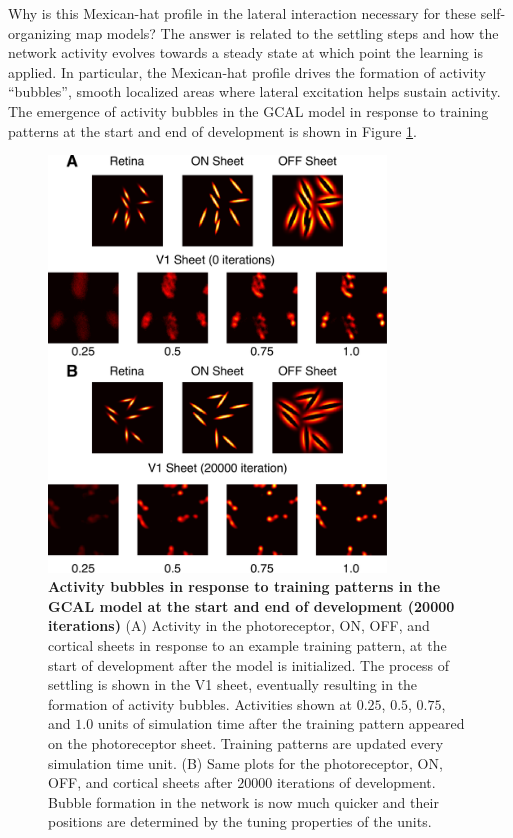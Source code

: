 \documentclass[phd,ianc,twoside]{infthesis}
\begin{document}
Why is this Mexican-hat profile in the lateral interaction necessary for
these self-organizing map models? The answer is related to the settling
steps and how the network activity evolves towards a steady state at
which point the learning is applied. In particular, the Mexican-hat
profile drives the formation of activity ``bubbles'', smooth localized
areas where lateral excitation helps sustain activity. The emergence of
activity bubbles in the GCAL model in response to training patterns at
the start and end of development is shown in Figure
\ref{fig:GCAL_Activity_Bubbles}.

\begin{figure}
\center
\includegraphics[width=0.8\textwidth]{./figures/GCAL_Activity_Bubbles.pdf}
\caption{{\bf Activity bubbles in response to training patterns in the
    GCAL model at the start and end of development (20000 iterations)}
  (A) Activity in the photoreceptor, ON, OFF, and cortical sheets in
  response to an example training pattern, at the start of development
  after the model is initialized. The process of settling is shown in
  the V1 sheet, eventually resulting in the formation of activity
  bubbles. Activities shown at $0.25$, $0.5$, $0.75$, and $1.0$ units of
  simulation time after the training pattern appeared on the
  photoreceptor sheet. Training patterns are updated every simulation
  time unit.  (B) Same plots for the photoreceptor, ON, OFF, and cortical
  sheets after $20000$ iterations of development. Bubble formation in
  the network is now much quicker and their positions are determined by
  the tuning properties of the units.}
  \label{fig:GCAL_Activity_Bubbles}
\end{figure}
\end{document}
